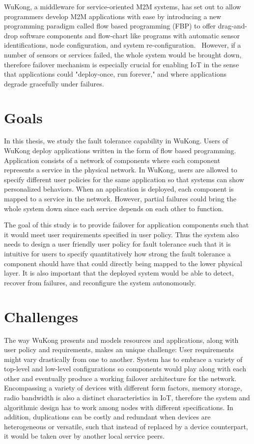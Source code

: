 WuKong, a middleware for service-oriented M2M systems, has set out to allow
programmers develop M2M applications with ease by introducing a new
programming paradigm called flow based programming (FBP) to offer drag-and-drop
software components and flow-chart like programs with automatic sensor
identifications, node configuration, and system re-configuration.~\cite{Reijers}
However, if a number of sensors or services failed, the whole system would be
brought down, therefore failover mechanism is especially crucial for enabling
IoT in the sense that applications could "deploy-once, run forever," and where
applications degrade gracefully under failures.


\section{Goals} %

In this thesis, we study the fault tolerance capability in WuKong.  Users of
WuKong deploy applications written in the form of flow based programming.
Application consists of a network of components where each component represents
a service in the physical network. In WuKong, users are allowed to specify
different user policies for the same application so that systems can show
personalized behaviors. When an application is deployed, each component is
mapped to a service in the network. However, partial failures could bring the
whole system down since each service depends on each other to function.

The goal of this study is to provide failover for application components such
that it would meet user requirements specified in user policy. Thus the system
also needs to design a user friendly user policy for fault tolerance such that
it is intuitive for users to specify quantitatively how strong the fault
tolerance a component should have that could directly being mapped to the lower
physical layer. It is also important that the deployed system would be able to
detect, recover from failures, and reconfigure the system autonomously.


\section{Challenges}

The way WuKong presents and models resources and applications, along with user
policy and requirements, makes an unique challenge: User requirements might
vary drastically from one to another. System has to embrace a variety of
top-level and low-level configurations so components would play along with each
other and eventually produce a working failover architecture for the network.
Encompassing a variety of devices with different form factors, memory storage,
radio bandwidth is also a distinct characteristics in IoT,
therefore the system and algorithmic design has to work among nodes
with different specifications. In addition, duplications can be
costly and redundant when devices are heterogeneous or versatile,
such that instead of replaced by a device counterpart, it would be
taken over by another local service peers.

